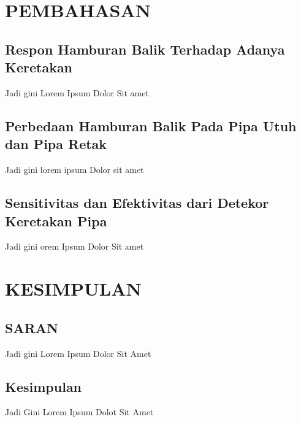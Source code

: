 \documentclass[12pt,a4paper]{report}
\begin{document}
\chapter{PEMBAHASAN}
\section{Respon Hamburan Balik Terhadap Adanya Keretakan}
Jadi gini Lorem Ipsum Dolor Sit amet

\section{Perbedaan Hamburan Balik Pada Pipa Utuh dan Pipa Retak}
Jadi gini lorem ipsum Dolor sit amet

\section{Sensitivitas dan Efektivitas dari Detekor Keretakan Pipa}
Jadi gini orem Ipsum Dolor Sit amet

\chapter{KESIMPULAN}
\section{SARAN}
Jadi gini Lorem Ipsum Dolor Sit Amet

\section{Kesimpulan}
Jadi Gini Lorem Ipsum Dolot Sit Amet


\renewcommand{\bibname}{DAFTAR PUSTAKA}
\end{document}

